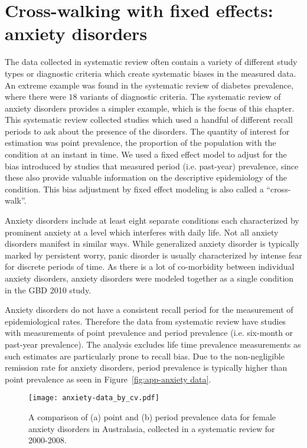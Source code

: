 \chapter{Cross-walking with fixed effects: anxiety disorders}
\label{applications-efx_study_level}

The data collected in systematic review often contain a variety of
different study types or diagnostic criteria which create systematic
biases in the measured data.  An extreme example was found in the
systematic review of diabetes prevalence, where there were $18$ variants
of diagnostic criteria.  The systematic review of anxiety disorders
provides a simpler example, which is the focus of this chapter. This
systematic review collected studies which used a handful of different
recall periods to ask about the presence of the disorders. The quantity
of interest for estimation was point prevalence, the
proportion of the population with the condition at an instant in time.
We used a fixed effect model to adjust for the bias introduced by
studies that measured period (i.e. past-year) prevalence, since these also provide
valuable information on the descriptive epidemiology of the condition.
This bias adjustment by fixed effect modeling is also called a
``cross-walk''.

Anxiety disorders include at least eight separate conditions each
characterized by prominent anxiety at a level which interferes with
daily life.  Not all anxiety disorders manifest in similar ways.
While generalized anxiety disorder is typically marked by persistent
worry, panic disorder is usually characterized by intense fear for
discrete periods of time. \cite{american_psychiatric_association_diagnostic_2000} As there is
a lot of co-morbidity between individual anxiety disorders, anxiety
disorders were modeled together as a single condition in the GBD 2010
study.

Anxiety disorders do not have a consistent recall period for the
measurement of epidemiological rates.  Therefore the data from
systematic review have studies with measurements of point prevalence
and period prevalence (i.e. six-month or past-year prevalence).  The
analysis excludes life time prevalence measurements as such estimates
are particularly prone to recall bias.  Due to the non-negligible
remission rate for anxiety disorders, period prevalence is typically
higher than point prevalence as seen in Figure~\ref{fig:app-anxiety
  data}.

    \begin{figure}[h]
        \begin{center}
            \texttt{[image: anxiety-data\_by\_cv.pdf]}
            \caption{A comparison of (a) point and (b) period prevalence data
              for female anxiety disorders in Australasia, collected in a systematic review for
              2000-2008.}
            \label{fig:app-anxiety data}
        \end{center}
    \end{figure}

